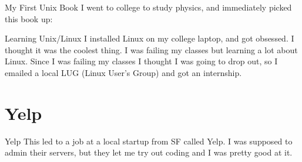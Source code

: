 \documentclass[14pt]{beamer}
\begin{document}
\begin{frame}{My First Unix Book}
  I went to college to study physics, and immediately picked this book up:
  \newline
  \newline
\end{frame}

\begin{frame}{Learning Unix/Linux}
  I installed Linux on my college laptop, and got obsessed. I thought it was the
  coolest thing. I was failing my classes but learning a lot about Linux.
  \newline
  \newline
  Since I was failing my classes I thought I was going to drop out, so I emailed
  a local LUG (Linux User's Group) and got an internship.
\end{frame}

\section{Yelp}

\begin{frame}{Yelp}
  This led to a job at a local startup from SF called Yelp.
  \newline
  \newline
  I was supposed to admin their servers, but they let me try out coding and I
  was pretty good at it.
\end{frame}
\end{document}
